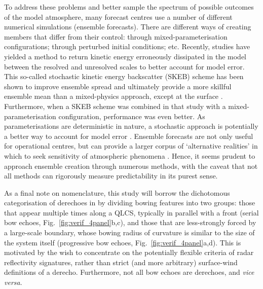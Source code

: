 \documentclass{ametsoc}
\begin{document}
To address these problems and better sample the spectrum of possible outcomes of the model atmosphere, many forecast centres use a number of different numerical simulations (ensemble forecasts). There are different ways of creating members that differ from their control: through mixed-parameterisation configurations; through perturbed initial conditions; etc. Recently, studies have yielded a method to return kinetic energy erroneously dissipated in the model between the resolved and unresolved scales to better account for model error. This so-called stochastic kinetic energy backscatter (SKEB) scheme has been shown to improve ensemble spread and ultimately provide a more skillful ensemble mean than a mixed-physics approach, except at the surface \citep{Berner2011-pd}. Furthermore, when a SKEB scheme was combined in that study with a mixed-parameterisation configuration, performance was even better. As parameterisations are deterministic in nature, a stochastic approach is potentially a better way to account for model error \citep{Palmer2001-hh}. Ensemble forecasts are not only useful for operational centres, but can provide a larger corpus of `alternative realities' in which to seek sensitivity of atmospheric phenomena \citep{Hanley2013-ch}. Hence, it seems prudent to approach ensemble creation through numerous methods, with the caveat that not all methods can rigorously measure predictability in its purest sense. 


As a final note on nomenclature, this study will borrow the dichotomous categorisation of derechoes in \citet{Johns1987-qj} by dividing bowing features into two groups: those that appear multiple times along a QLCS, typically in parallel with a front (serial bow echoes, Fig.~\ref{fig:verif_4panel}b,c), and those that are less-strongly forced by a large-scale boundary, whose bowing radius of curvature is similar to the size of the system itself (progressive bow echoes, Fig.~\ref{fig:verif_4panel}a,d). This is motivated by the wish to concentrate on the potentially flexible criteria of radar reflectivity signatures, rather than strict (and more arbitrary) surface-wind definitions of a derecho. Furthermore, not all bow echoes are derechoes, and {\it vice versa}.
\end{document}
